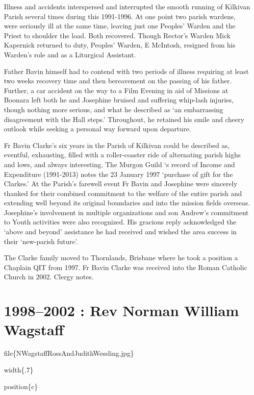 Illness and accidents interspersed and interrupted the smooth running of Kilkivan Parish several times during this 1991-1996. At one point two parish wardens, were seriously ill at the same time, leaving just one Peoples' Warden and the Priest to shoulder the load. Both recovered. Though Rector's Warden Mick Kapernick returned to duty, Peoples' Warden, E McIntosh, resigned from his Warden's role and as a Liturgical Assistant.

Father Bavin himself had to contend with two periods of illness requiring at least two weeks recovery time and then bereavement on the passing of his father. Further, a car accident on the way to a Film Evening in aid of Missions at Boonara left both he and Josephine bruised and suffering whip-lash injuries, though nothing more serious, and what he described as `an embarrassing disagreement with the Hall steps.' Throughout, he retained his smile and cheery outlook while seeking a personal way forward upon departure.

Fr Bavin Clarke's six years in the Parish of Kilkivan could be described as, eventful, exhausting, filled with a roller-coaster ride of alternating parish highs and lows, and always interesting. The Murgon Guild `s record of Income and Expenditure (1991-2013) notes the 23 January 1997 `purchase of gift for the Clarkes.' At the Parish's farewell event Fr Bavin and Josephine were sincerely thanked for their combined commitment to the welfare of the entire parish and extending well beyond its original boundaries and into the mission fields overseas. Josephine's involvement in multiple organizations and son Andrew's commitment to Youth activities were also recognized. His gracious reply acknowledged the `above and beyond' assistance he had received and wished the area success in their `new-parish future'.

The Clarke family moved to Thornlands, Brisbane where he took a position a Chaplain QIT from 1997. Fr Bavin Clarke was received into the Roman Catholic Church in 2002. Clergy notes.

\hypertarget{rev-norman-william-wagstaff}{%
\section{1998--2002 : Rev Norman William Wagstaff}\label{rev-norman-william-wagstaff}}

file\{NWagstaffRossAndJudithWessling.jpg\}

width\{.7\}

position\{c\}

